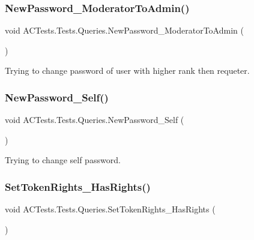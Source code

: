 \subsubsection{\texorpdfstring{New\+Password\+\_\+\+Moderator\+To\+Admin()}{NewPassword\_ModeratorToAdmin()}}
{\footnotesize\ttfamily void A\+C\+Tests.\+Tests.\+Queries.\+New\+Password\+\_\+\+Moderator\+To\+Admin (\begin{DoxyParamCaption}{ }\end{DoxyParamCaption})}



Trying to change password of user with higher rank then requeter. 

\mbox{\label{class_a_c_tests_1_1_tests_1_1_queries_a6e0f0bb08cea34e8e078acdb761f05ab}} 
\subsubsection{\texorpdfstring{New\+Password\+\_\+\+Self()}{NewPassword\_Self()}}
{\footnotesize\ttfamily void A\+C\+Tests.\+Tests.\+Queries.\+New\+Password\+\_\+\+Self (\begin{DoxyParamCaption}{ }\end{DoxyParamCaption})}



Trying to change self password. 

\mbox{\label{class_a_c_tests_1_1_tests_1_1_queries_a3960f1ab51e343168f23590ef058599a}} 
\subsubsection{\texorpdfstring{Set\+Token\+Rights\+\_\+\+Has\+Rights()}{SetTokenRights\_HasRights()}}
{\footnotesize\ttfamily void A\+C\+Tests.\+Tests.\+Queries.\+Set\+Token\+Rights\+\_\+\+Has\+Rights (\begin{DoxyParamCaption}{ }\end{DoxyParamCaption})}



